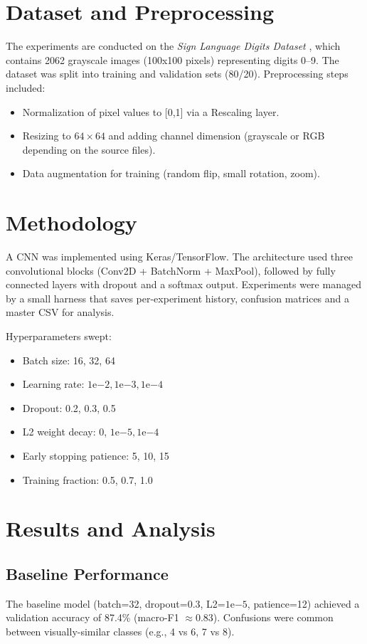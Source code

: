 \documentclass[conference]{IEEEtran}
\begin{document}
\section{Dataset and Preprocessing}
The experiments are conducted on the \textit{Sign Language Digits Dataset} \cite{b9}, which contains 2062 grayscale images (100x100 pixels) representing digits 0--9. The dataset was split into training and validation sets (80/20). Preprocessing steps included:
\begin{itemize}
    \item Normalization of pixel values to [0,1] via a Rescaling layer.
    \item Resizing to \(64\times64\) and adding channel dimension (grayscale or RGB depending on the source files).
    \item Data augmentation for training (random flip, small rotation, zoom).
\end{itemize}

\section{Methodology}
A CNN was implemented using Keras/TensorFlow. The architecture used three convolutional blocks (Conv2D + BatchNorm + MaxPool), followed by fully connected layers with dropout and a softmax output. Experiments were managed by a small harness that saves per-experiment history, confusion matrices and a master CSV for analysis.

Hyperparameters swept:
\begin{itemize}
    \item Batch size: 16, 32, 64
    \item Learning rate: \(1\mathrm{e}{-2}, 1\mathrm{e}{-3}, 1\mathrm{e}{-4}\)
    \item Dropout: 0.2, 0.3, 0.5
    \item L2 weight decay: 0, \(1\mathrm{e}{-5}, 1\mathrm{e}{-4}\)
    \item Early stopping patience: 5, 10, 15
    \item Training fraction: 0.5, 0.7, 1.0
\end{itemize}

\section{Results and Analysis}
\subsection{Baseline Performance}
The baseline model (batch=32, dropout=0.3, L2=\(1\mathrm{e}{-5}\), patience=12) achieved a validation accuracy of 87.4\% (macro-F1 \(\approx 0.83\)). Confusions were common between visually-similar classes (e.g., 4 vs 6, 7 vs 8).
\end{document}
